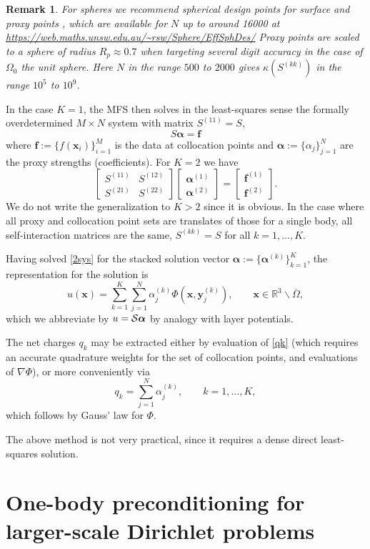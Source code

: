 \documentclass[10pt]{article}
\newcommand{\be}{\begin{equation}}
\newcommand{\ee}{\end{equation}}
\newcommand{\R}{\mathbb{R}}
\newcommand{\vt}[2]{\left[\begin{array}{r}#1\\#2\end{array}\right]} %
\newcommand{\mt}[4]{\left[\begin{array}{ll}#1&#2\\#3&#4\end{array}\right]} %
\newtheorem{rmk}[thm]{Remark}
\newcommand{\x}{\mathbf{x}}
\newcommand{\y}{\mathbf{y}}
\newcommand{\f}{\mathbf{f}}
\newcommand{\bal}{\bm{\alpha}}
\newcommand{\E}{\R^3\backslash\overline{\Omega}}    %
\newcommand{\ok}{^{(k)}}
\newcommand{\SR}{{\cal S}}           %
\begin{document}
\begin{rmk}
  For spheres we recommend spherical design points for surface and proxy
  points \cite{sphdesign},
which are available for $N$ up to around 16000 at
\url{https://web.maths.unsw.edu.au/~rsw/Sphere/EffSphDes/}
Proxy points are scaled to a sphere of radius $R_p \approx 0.7$
when targeting several digit accuracy in the case of $\Omega_0$ the unit sphere.
Here $N$ in the range $500$ to $2000$ gives
$\kappa(S^{(kk)})$ in the range $10^5$ to $10^9$.
\end{rmk}

In the case $K=1$, the MFS then solves in the least-squares sense the
formally overdetermined $M\times N$ system with matrix $S^{(11)} = S$,
\be
S \bal = \f
\label{1sys}
\ee
where $\f:=\{f(\x_i)\}_{i=1}^M$ is the data at collocation points
and $\bal:=\{\alpha_j\}_{j=1}^N$ are the proxy strengths (coefficients).
For $K=2$ we have
\be
\mt{S^{(11)}}{S^{(12)}}{S^{(21)}}{S^{(22)}} \vt{\bal^{(1)}}{\bal^{(2)}} = \vt{\f^{(1)}}{\f^{(2)}}.
\label{2sys}
\ee
We do not write the generalization to $K>2$ since it is obvious.
In the case where all proxy and collocation point sets are
translates of those for a single body,
all self-interaction matrices are the same,
$S^{(kk)} = S$ for all $k=1,\dots,K$.

Having solved \eqref{2sys} for the stacked solution vector
$\bal:=\{\bal\ok\}_{k=1}^K$, the representation for the
solution is
\be
u(\x) = \sum_{k=1}^K \sum_{j=1}^N \alpha\ok_j \Phi(\x,\y\ok_j),
\qquad \x\in\E,
\label{rep}
\ee
which we abbreviate by $u = \SR\bal$ by analogy with layer potentials.

The net charges $q_k$ may be extracted either by evaluation of
\eqref{qk} (which requires an accurate quadrature weights
for the set of collocation points, and evaluations of $\nabla \Phi$),
or more conveniently via
\be
q_k = \sum_{j=1}^N \alpha\ok_j, \qquad k=1,\dots,K,
\label{qkgauss}
\ee
which follows by Gauss' law for $\Phi$.

The above method is not very practical, since it requires a
dense direct least-squares solution.


\section{One-body preconditioning for larger-scale Dirichlet problems}
\label{s:dirprec}
\end{document}

